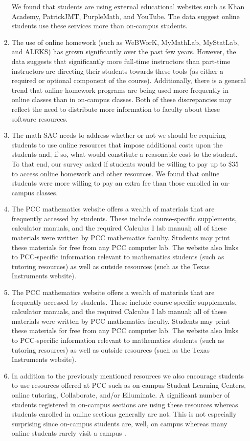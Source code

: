 \begin{enumerate}[label=Q\arabic*.,font=\bf]
    We found that students are using external educational websites such as Khan Academy, PatrickJMT, PurpleMath, and YouTube.  The data suggest online students use these services more than on-campus students.
  \item The use of online homework (such as WeBWorK,  MyMathLab, MyStatLab, and ALEKS) has grown significantly over the past few years. However, the data suggests that significantly more full-time instructors than part-time instructors are directing their students towards these tools (as either a required or optional component of the course).  Additionally, there is a general trend that online homework programs are being used more frequently in online classes than in on-campus classes.  Both of these discrepancies may reflect the need to distribute more information to faculty about these software resources.
  \item The math SAC needs to address whether or not we should be requiring students to use online resources that impose additional costs upon the students and, if so, what would constitute a reasonable cost to the student.  To that end, our survey asked if students would be willing to pay up to \$35 to access online homework and other resources.   We found that online students were more willing to pay an extra fee than those enrolled in on-campus classes. 
  \item The PCC mathematics website offers a wealth of materials that are frequently accessed by students. These include course-specific supplements, calculator manuals, and the required Calculus I lab manual; all of these materials were written by PCC mathematics faculty.  Students may print these materials for free from any PCC computer lab. The website also links to PCC-specific information relevant to mathematics students (such as tutoring resources) as well as outside resources (such as the Texas Instruments website).  
    \setcounter{enumi}{6}
  \item The PCC mathematics website offers a wealth of materials that are frequently accessed by students. These include course-specific supplements, calculator manuals, and the required Calculus I lab manual; all of these materials were written by PCC mathematics faculty.  Students may print these materials for free from any PCC computer lab. The website also links to PCC-specific information relevant to mathematics students (such as tutoring resources) as well as outside resources (such as the Texas Instruments website).  
    \setcounter{enumi}{8}
  \item In addition to the previously mentioned resources we also encourage students to use resources offered at PCC such as on-campus Student Learning Centers, online tutoring, Collaborate, and/or Elluminate. A significant number of students registered in on-campus sections are using these resources whereas students enrolled in online sections generally are not.  This is not especially surprising since on-campus students are, well, on campus whereas many online students rarely visit a campus . 
\end{enumerate}
